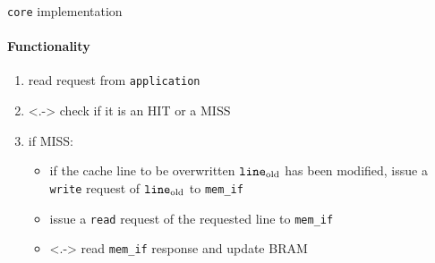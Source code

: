 \documentclass[handout]{beamer}
\begin{document}
\begin{frame}{\texttt{core} implementation}
	\framesubtitle{Functionality}
	\begin{minipage}{.7\textwidth}
		\begin{enumerate}[<+->]
			\item read request from \texttt{application}
			\item<.-> check if it is an HIT or a MISS
			\item if MISS: 
				\begin{itemize}
					\item if the cache line to be overwritten $\text{\texttt{line}}_{\text{old}}$
						has been modified, issue a \texttt{write}
						request of $\text{\texttt{line}}_{\text{old}}$ to \texttt{mem\_if}
					\item issue a \texttt{read} request of the
						requested line to \texttt{mem\_if}
					\item<.-> read \texttt{mem\_if} response and
						update BRAM


\end{itemize}
\end{enumerate}
\end{minipage}
\end{frame}
\end{document}
